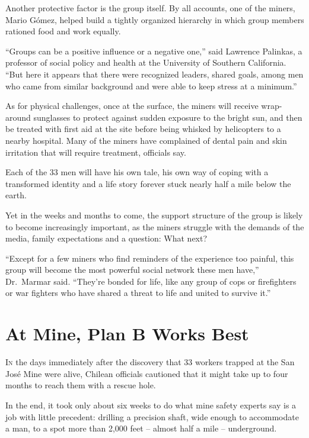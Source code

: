 ﻿\documentclass[12pt]{article}
\begin{document}
Another protective factor is the group itself. By all accounts, one of the miners, Mario G\'omez,
helped build a tightly organized hierarchy in which group members rationed food and work equally.

``Groups can be a positive influence or a negative one,'' said Lawrence Palinkas, a professor of
social policy and health at the University of Southern California. ``But here it appears that there
were recognized leaders, shared goals, among men who came from similar background and were able to
keep stress at a minimum.''

As for physical challenges, once at the surface, the miners will receive wrap-around sunglasses to
protect against sudden exposure to the bright sun, and then be treated with first aid at the site
before being whisked by helicopters to a nearby hospital. Many of the miners have complained of
dental pain and skin irritation that will require treatment, officials say.

Each of the 33 men will have his own tale, his own way of coping with a transformed identity and a
life story forever stuck nearly half a mile below the earth.

Yet in the weeks and months to come, the support structure of the group is likely to become
increasingly important, as the miners struggle with the demands of the media, family expectations
and a question: What next?

``Except for a few miners who find reminders of the experience too painful, this group will become
the most powerful social network these men have,'' Dr.~Marmar said. ``They're bonded for life, like
any group of cops or firefighters or war fighters who have shared a threat to life and united to
survive it.''

\section{At Mine, Plan B Works Best}

\lettrine{I}{n} the days immediately after the discovery that 33 workers
trapped at the San Jos\'e Mine were alive, Chilean officials cautioned that it might take up to four
months to reach them with a rescue hole.

In the end, it took only about six weeks to do what mine safety experts say is a job with little
precedent: drilling a precision shaft, wide enough to accommodate a man, to a spot more than 2,000
feet -- almost half a mile -- underground.
\end{document}
